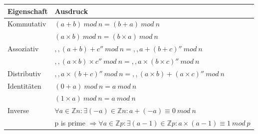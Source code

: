 \documentclass[a4paper]{article}
\begin{document}
\begin{multicols}{3}
      \begin{tabular}{l|l}
            Eigenschaft & Ausdruck                                                                                                          \\\hline
            Kommutativ  & $(a + b)\ mod\ n = (b+ a)\ mod\ n$                                                                                \\
                        & $(a \times b)\ mod\ n = (b \times a)\ mod\ n$                                                                     \\
            Assoziativ  & $,,(a + b) + c''\ mod\ n = ,,a + (b + c)''\ mod\ n$                                                               \\
                        & $,,(a \times b) \times c''\ mod\ n = ,,a \times (b \times c)''\ mod\ n$                                           \\
            Distributiv & $,,a \times (b + c)''\ mod\ n = ,,(a \times b) + (a \times c)''\ mod\ n$                                          \\
            Identitäten & $(0 + a)\ mod\ n = a\ mod\ n$                                                                                     \\
                        & $(1 \times a)\ mod\ n = a\ mod\ n$                                                                                \\
            Inverse     & $\forall a \in \mathbb{Z}n: \exists (-a)\in \mathbb{Z}n : a + (-a) \equiv 0\ mod\ n$                              \\
                        & p is prime $\Rightarrow \forall a\in \mathbb{Z}p: \exists (a-1) \in \mathbb{Z}p: a \times (a-1) \equiv 1\ mod\ p$
      \end{tabular}


\end{multicols}
\end{document}
